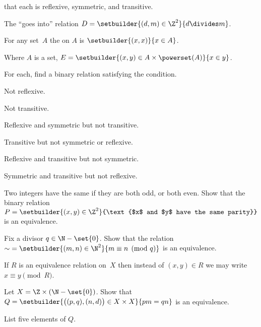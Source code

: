 \documentclass{ibl}
\begin{document}
\begin{ex}   \pord{} that each is reflexive, symmetric, and transitive.
\begin{exes}
\item The ``goes into'' relation
  $D=\setbuilder{(d,m)\in\Z^2}{d\divides m}$.
\item
  For any set~$A$ the  on $A$ 
  is $\setbuilder{(x,x)}{x\in A}$. 
\item
  Where $A$ is a set,
  $E=\setbuilder{(x,y)\in A\times\powerset(A)}{x\in y}$.
\end{exes}
\end{ex}

\begin{ex} For each, find a binary relation satisfying the condition.
\begin{exes}
\item Not reflexive.
\item Not transitive.
\item Reflexive and symmetric but not transitive.
\item Transitive but not symmetric or reflexive.
\item Reflexive and transitive but not symmetric.
\item Symmetric and transitive but not reflexive. 
\end{exes}
\end{ex}

\begin{ex}
Two integers have the same  if they are both odd, or 
both even.
Show that the binary relation 
$P=\setbuilder{(x,y)\in\Z^2}{\text{$x$ and $y$ have the same parity}}$  
is an equivalence.
\end{ex}

\begin{ex}
Fix a divisor $q\in\N-\set{0}$.
Show that the relation 
$\mathord\sim=\setbuilder{(m,n)\in\N^2}{m\equiv n\pmod q}$  
is an equivalence.
\end{ex}

\begin{df}
If $R$ is an equivalence relation on~$X$ then instead of $(x,y)\in R$
we may write $x\equiv y\pmod R$.  
\end{df}

\begin{ex} \label{RationalsAsEqClasses}
\begin{exes}
\item Let $X=\Z\times (\N-\set{0})$.
Show that 
$Q=\setbuilder{\big((p,q),(n,d)\big)\in X\times X}{pm=qn}$
is an equivalence.
\item List five elements of $Q$.
\end{exes}
\end{ex}
\end{document}
